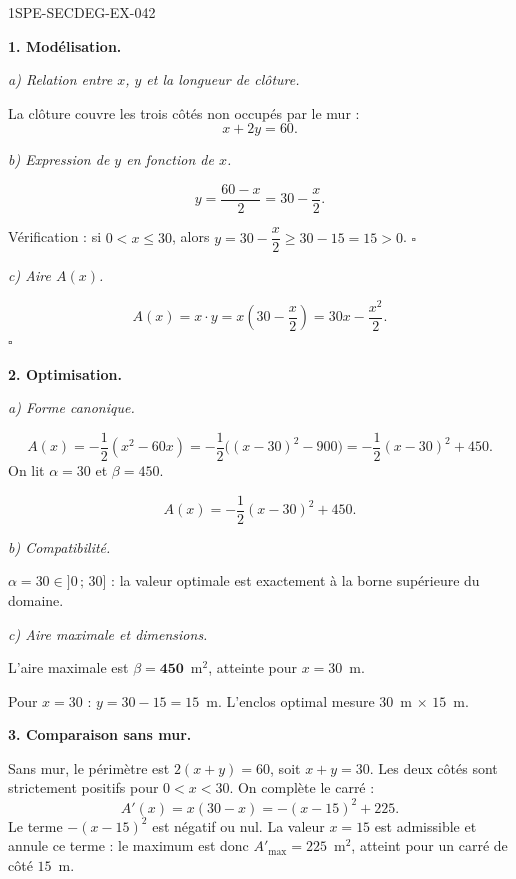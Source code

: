 \begin{corrige}{1SPE-SECDEG-EX-042}

\textbf{1. Modélisation.}

\textit{a) Relation entre $x$, $y$ et la longueur de clôture.}


La clôture couvre les trois côtés non occupés par le mur :
\[x + 2y = 60.\]

\textit{b) Expression de $y$ en fonction de $x$.}

\[y = \frac{60 - x}{2} = 30 - \frac{x}{2}.\]

Vérification : si $0 < x \leqslant 30$, alors $y = 30 - \dfrac{x}{2} \geqslant 30 - 15 = 15 > 0$. \hfill $\square$

\textit{c) Aire $A(x)$.}

\[A(x) = x \cdot y = x\!\left(30 - \frac{x}{2}\right) = 30x - \frac{x^2}{2}.\] \hfill $\square$

\medskip
\textbf{2. Optimisation.}

\textit{a) Forme canonique.}


\[A(x)=-\frac{1}{2}(x^2-60x)
=-\frac{1}{2}\bigl((x-30)^2-900\bigr)=-\frac{1}{2}(x-30)^2+450.\]
On lit $\alpha=30$ et $\beta=450$.

\[A(x) = -\frac{1}{2}(x - 30)^2 + 450.\]

\textit{b) Compatibilité.}

$\alpha = 30 \in ]0\,;\,30]$ : la valeur optimale est exactement à la borne supérieure du domaine.

\textit{c) Aire maximale et dimensions.}

L'aire maximale est $\beta = \mathbf{450}$~m$^2$, atteinte pour $x = 30$~m.

Pour $x = 30$ : $y = 30 - 15 = 15$~m. L'enclos optimal mesure $30$~m $\times$ $15$~m.

\medskip
\textbf{3. Comparaison sans mur.}


Sans mur, le périmètre est $2(x + y) = 60$, soit $x + y = 30$. Les deux côtés sont strictement positifs pour $0<x<30$. On complète le carré :
\[A'(x) = x(30-x) = -(x-15)^2+225.\]
Le terme $-(x-15)^2$ est négatif ou nul. La valeur $x=15$ est admissible et annule ce terme : le maximum est donc $A'_{\max}=225$~m$^2$, atteint pour un carré de côté $15$~m.


\end{corrige}

